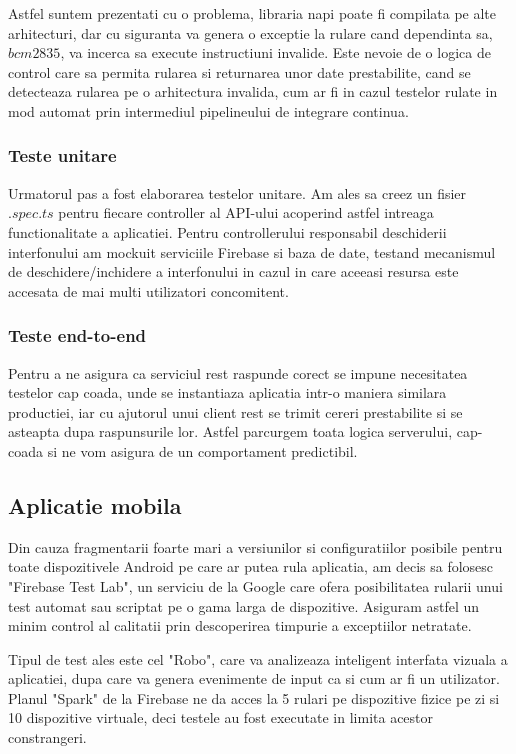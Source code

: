 Astfel suntem prezentati cu o problema, libraria \acrshort{napi} poate fi compilata pe alte arhitecturi, dar cu siguranta va genera o exceptie la rulare cand dependinta sa, $bcm2835$, va incerca sa execute instructiuni invalide. Este nevoie de o logica de control care sa permita rularea si returnarea unor date prestabilite, cand se detecteaza rularea pe o arhitectura invalida, cum ar fi in cazul testelor rulate in mod automat prin intermediul pipelineului de integrare continua.

\subsubsection {Teste unitare}

Urmatorul pas a fost elaborarea testelor unitare. Am ales sa creez un fisier $.spec.ts$ pentru fiecare controller al API-ului acoperind astfel intreaga functionalitate a aplicatiei. Pentru controllerului responsabil deschiderii interfonului am mockuit serviciile Firebase si baza de date, testand mecanismul de deschidere/inchidere a interfonului in cazul in care aceeasi resursa este accesata de mai multi utilizatori concomitent.

\subsubsection {Teste end-to-end}

Pentru a ne asigura ca serviciul \acrshort{rest} raspunde corect se impune necesitatea testelor cap coada, unde se instantiaza aplicatia intr-o maniera similara productiei, iar cu ajutorul unui client rest se trimit cereri prestabilite si se asteapta dupa raspunsurile lor. Astfel parcurgem toata logica serverului, cap-coada si ne vom asigura de un comportament predictibil.

\subsection {Aplicatie mobila}

Din cauza fragmentarii foarte mari a versiunilor si configuratiilor posibile pentru toate dispozitivele Android pe care ar putea rula aplicatia, am decis sa folosesc "Firebase Test Lab", un serviciu de la Google care ofera posibilitatea rularii unui test automat sau scriptat pe o gama larga de dispozitive. 
Asiguram astfel un minim control al calitatii prin descoperirea timpurie a exceptiilor netratate.

Tipul de test ales este cel "Robo", care va analizeaza inteligent interfata vizuala a aplicatiei, dupa care va genera evenimente de input ca si cum ar fi un utilizator. Planul "Spark" de la Firebase ne da acces la 5 rulari pe dispozitive fizice pe zi si 10 dispozitive virtuale, deci testele au fost executate in limita acestor constrangeri. 

